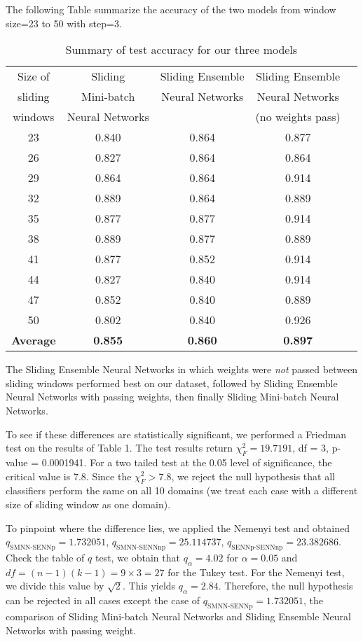 \documentclass[conference]{IEEEtran}
\begin{document}
		The following Table summarize the accuracy of the two models from window size=23 to 50 with step=3.
		\begin{table}[H]
			\centering
			\begin{tabular}{ccccc}
				\hline
				Size of&  Sliding& Sliding Ensemble& Sliding Ensemble\\
				sliding&  Mini-batch& Neural Networks& Neural Networks\\
				windows&  Neural Networks& & (no weights pass)\\
				\hline
				23 &  0.840 & 0.864 & 0.877 \\ 
				26 &  0.827 & 0.864 & 0.864 \\ 
				29 &  0.864 & 0.864 & 0.914 \\ 
				32 &  0.889 & 0.864 & 0.889 \\ 
				35 &  0.877 & 0.877 & 0.914 \\ 
				38 &  0.889 & 0.877 & 0.889 \\ 
				41 &  0.877 & 0.852 & 0.914 \\ 
				44 &  0.827 & 0.840 & 0.914 \\ 
				47 &  0.852 & 0.840 & 0.889 \\ 
				50 &  0.802 & 0.840 & 0.926 \\ 
				\hline
				\textbf{Average} & \textbf{0.855} &\textbf{0.860} &\textbf{0.897} \\
				\hline
			\end{tabular}
			\caption{Summary of test accuracy for our three models}
		\end{table}
		
		The Sliding Ensemble Neural Networks in which weights were \emph{not} passed between sliding windows performed best on our dataset, followed by Sliding Ensemble Neural Networks with passing weights, then finally Sliding Mini-batch Neural Networks.
		
		To see if these differences are statistically significant, we performed a Friedman test on the results of Table 1. The test results return $\chi^2_F= 19.7191$, df = 3, p-value = 0.0001941. For a two tailed test at the 0.05 level of significance, the critical value is 7.8. Since the $\chi_F^2 >7.8$, we reject the null hypothesis that all classifiers perform the same on all 10 domains (we treat each case with a different size of sliding window as one domain).
		
		To pinpoint where the difference lies, we applied the Nemenyi test and obtained $q_{\text{SMNN-SENNp}}= 1.732051$,  $q_{\text{SMNN-SENNnp}}=25.114737$, $q_{\text{SENNp-SENNnp}}=23.382686$.
		Check the table of $q$ test, we obtain that $q_\alpha=4.02$ for $\alpha=0.05$ and $df = (n-1)(k-1) = 9 \times 3 = 27$ for the Tukey test. For the Nemenyi test, we divide this value by $\sqrt{2}$. This yields $q_\alpha = 2.84$. Therefore, the null hypothesis can be rejected in all cases except the case of $q_{\text{SMNN-SENNp}}= 1.732051$, the comparison of Sliding Mini-batch Neural Networks and Sliding Ensemble Neural Networks with passing weight.
		
\end{document}
